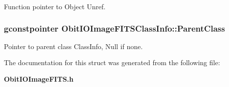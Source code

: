 Function pointer to Object Unref. 

\subsubsection{\setlength{\rightskip}{0pt plus 5cm}gconstpointer {\bf Obit\-IOImage\-FITSClass\-Info::Parent\-Class}}\label{structObitIOImageFITSClassInfo_o3}


Pointer to parent class Class\-Info, Null if none. 



The documentation for this struct was generated from the following file:\begin{CompactItemize}
\item 
{\bf Obit\-IOImage\-FITS.h}\end{CompactItemize}
